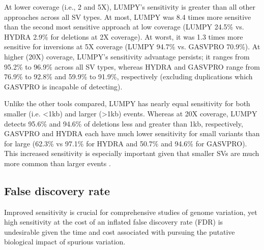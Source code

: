 \documentclass[10pt]{bmc_article}
\def\texttt{[image: ]}
\newenvironment{bmcformat}{\begin{raggedright}\baselineskip20pt\sloppy\setboolean{publ}{false}}{\end{raggedright}\baselineskip20pt\sloppy}
\begin{document}
\begin{bmcformat}

At lower coverage (i.e., 2 and 5X), LUMPY's sensitivity is greater
than all other approaches across all SV types. At most, LUMPY was
8.4 times more sensitive than the second most sensitive approach at low
coverage (LUMPY 24.5\% vs. HYDRA 2.9\% for deletions at 2X coverage). At worst,
it was 1.3 times more sensitive for inversions at 5X coverage (LUMPY 94.7\% vs.
GASVPRO 70.9\%). At higher (20X) coverage,
LUMPY's sensitivity advantage persists; it ranges from 95.2\% to 96.9\%
across all SV types, whereas HYDRA and GASVPRO range from 76.9\% to 92.8\% and
59.9\% to 91.9\%, respectively (excluding duplications which GASVPRO is
incapable of detecting).

Unlike the other tools compared, LUMPY has nearly equal sensitivity for
both smaller (i.e. \textless 1kb) and larger (\textgreater 1kb) events.
Whereas at 20X coverage,
LUMPY detects 95.6\% and 94.6\% of deletions less and greater than 1kb,
respectively, GASVPRO and HYDRA each have much lower sensitivity for small
variants than for large (62.3\% vs 97.1\% for HYDRA and 50.7\% and 94.6\% for
GASVPRO). This increased sensitivity is especially important given that smaller
SVs are much more common than larger events \cite{mills2011}.


\subsection*{False discovery rate}
Improved sensitivity is crucial for comprehensive studies of genome variation,
yet high sensitivity at the cost of an inflated false discovery rate (FDR) is
undesirable given the time and cost associated with pursuing the putative
biological impact of spurious variation.


\end{bmcformat}
\end{document}
